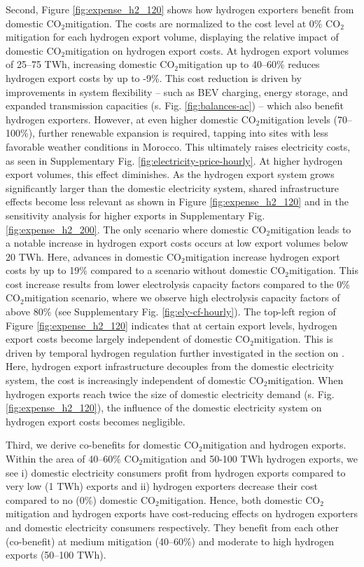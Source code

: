 \documentclass[5p,numafflabel]{elsarticle}
\newcommand{\co}{\ce{CO2}~}
\def\co{CO${}_2${\:}}
\begin{document}
Second, Figure \ref{fig:expense_h2_120} shows how hydrogen exporters benefit from domestic \co mitigation.
The costs are normalized to the cost level at 0\% \co mitigation for each hydrogen export volume, displaying the relative impact of domestic \co mitigation on hydrogen export costs.
At hydrogen export volumes of 25--75 TWh, increasing domestic \co mitigation up to 40–60\% reduces hydrogen export costs by up to -9\%. 
This cost reduction is driven by improvements in system flexibility -- such as BEV charging, energy storage, and expanded transmission capacities (s. Fig. \ref{fig:balances-ac}) -- which also benefit hydrogen exporters.
However, at even higher domestic \co mitigation levels (70--100\%), further renewable expansion is required, tapping into sites with less favorable weather conditions in Morocco. This ultimately raises electricity costs, as seen in Supplementary Fig. \ref{fig:electricity-price-hourly}.
At higher hydrogen export volumes, this effect diminishes. As the hydrogen export system grows significantly larger than the domestic electricity system, shared infrastructure effects become less relevant 
as shown in Figure \ref{fig:expense_h2_120} and in the sensitivity analysis for higher exports in Supplementary Fig. \ref{fig:expense_h2_200}. 
The only scenario where domestic \co mitigation leads to a notable increase in hydrogen export costs occurs at low export volumes below 20 TWh. Here, advances in domestic \co mitigation increase hydrogen export costs by up to 19\% compared to a scenario without domestic \co mitigation. 
This cost increase results from lower electrolysis capacity factors compared to the 0\% \co mitigation scenario, where we observe high electrolysis capacity factors of above 80\% (see Supplementary Fig. \ref{fig:ely-cf-hourly}).
The top-left region of Figure \ref{fig:expense_h2_120} indicates that at certain export levels, hydrogen export costs become largely independent of domestic \co mitigation. This is driven by temporal hydrogen regulation further investigated in the section on . Here, hydrogen export infrastructure decouples from the domestic electricity system, the cost is increasingly independent of domestic \co mitigation.
When hydrogen exports reach twice the size of domestic electricity demand (s. Fig. \ref{fig:expense_h2_120}), the influence of the domestic electricity system on hydrogen export costs becomes negligible.


Third, we derive co-benefits for domestic \co mitigation and hydrogen exports. 
Within the area of 40--60\% \co mitigation and 50-100 TWh hydrogen exports, we see i) domestic electricity consumers profit from hydrogen exports compared to very low (1 TWh) exports and ii) hydrogen exporters decrease their cost compared to no (0\%) domestic \co mitigation. 
Hence, both domestic \co mitigation and hydrogen exports have cost-reducing effects on hydrogen exporters and domestic electricity consumers respectively. They benefit from each other (co-benefit) at medium mitigation (40--60\%) and moderate to high hydrogen exports (50--100 TWh). 
\end{document}
